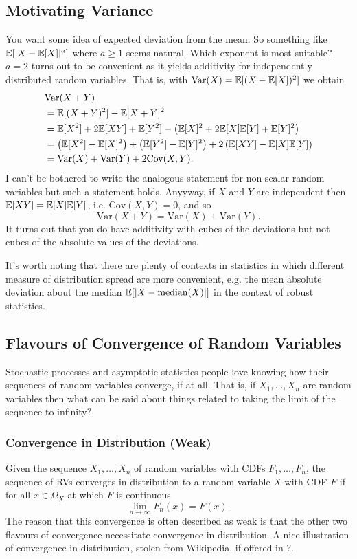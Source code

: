 \documentclass[11pt]{article}
\begin{document}
\begin{appendices}
\subsection{Motivating Variance}
You want some idea of expected deviation from the mean. So something like $\mathbb{E}[|X-\mathbb{E}[X]|^a]$ where $a\geq1$ seems natural. Which exponent is most suitable? $a=2$ turns out to be convenient as it yields additivity for independently distributed random variables. That is, with $\text{Var}(X)=\mathbb{E}[(X-\mathbb{E}[X])^2]$ we obtain
\begin{align*}
    &
    \text{Var}(X+Y)\\
    &=
    \mathbb{E}[(X+Y)^2]-\mathbb{E}[X+Y]^2\\
    &=
    \mathbb{E}[X^2]+2\mathbb{E}[XY]+\mathbb{E}[Y^2]-\left(\mathbb{E}[X]^2+2\mathbb{E}[X]\mathbb{E}[Y]+\mathbb{E}[Y]^2\right)\\
    &=
    \left(\mathbb{E}[X^2]-\mathbb{E}[X]^2\right)+\left(\mathbb{E}[Y^2]-\mathbb{E}[Y]^2\right)+2\left(\mathbb{E}[XY]-\mathbb{E}[X]\mathbb{E}[Y]\right)\\
    &=
    \text{Var}(X)+\text{Var}(Y)+2\text{Cov}(X,Y).
\end{align*}
I can't be bothered to write the analogous statement for non-scalar random variables but such a statement holds. Anyyway, if $X$ and $Y$ are independent then $\mathbb{E}[XY]=\mathbb{E}[X]\mathbb{E}[Y]$, i.e. $\text{Cov}(X,Y)=0$, and so
$$
\text{Var}(X+Y)
=
\text{Var}(X)+\text{Var}(Y).
$$
It turns out that you do have additivity with cubes of the deviations but not cubes of the absolute values of the deviations.

It's worth noting that there are plenty of contexts in statistics in which different measure of distribution spread are more convenient, e.g. the mean absolute deviation about the median $\mathbb{E}[|X-\text{median}(X)|]$ in the context of robust statistics.

\subsection{\TODO Flavours of Convergence of Random Variables}
Stochastic processes and asymptotic statistics people love knowing how their sequences of random variables converge, if at all. That is, if $X_1,\dots,X_n$ are random variables then what can be said about things related to taking the limit of the sequence to infinity?

\subsubsection*{Convergence in Distribution (Weak)}
Given the sequence $X_1,\dots,X_n$ of random variables with CDFs $F_1,\dots,F_n$, the sequence of RVs converges in distribution to a random variable $X$ with CDF $F$ if
for all $x\in\Omega_{X}$ at which $F$ is continuous
$$
\lim_{n\to\infty}F_n(x)
=
F(x).
$$
The reason that this convergence is often described as weak is that the other two flavours of convergence necessitate convergence in distribution. A nice illustration of convergence in distribution, stolen from Wikipedia, if offered in ?. 


\end{appendices}
\end{document}
